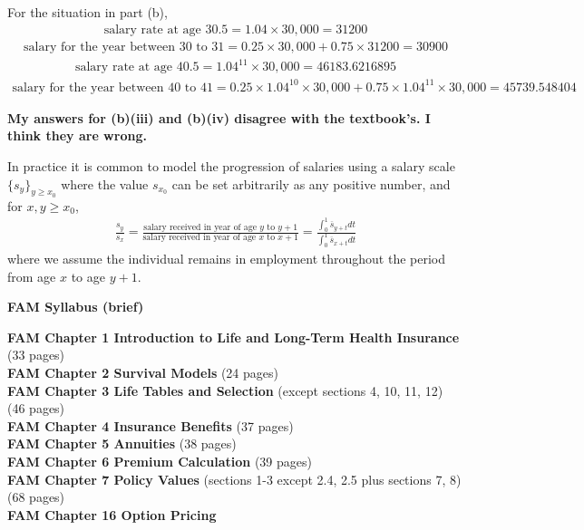 \documentclass[hidelinks, 12pt]{article}
\theoremstyle{mydefstyle}
\theoremstyle{mythmstyle}
\begin{document}
For the situation in part (b),
\begin{gather*}
\mbox{salary rate at age 30.5} = 1.04 \times 30,000 = 31200
\end{gather*}
\begin{gather*}
\mbox{salary for the year between 30 to 31} = 0.25 \times 30,000 + 0.75 \times 31200 = 30900
\end{gather*}
\begin{gather*}
\mbox{salary rate at age 40.5} = 1.04^{11} \times 30,000 = 46183.6216895
\end{gather*}
\begin{gather*}
\mbox{salary for the year between 40 to 41} = 0.25 \times 1.04^{10} \times 30,000 + 0.75 \times 1.04^{11} \times 30,000
= 45739.548404
\end{gather*}

\color{red}
\textbf{My answers for (b)(iii) and (b)(iv) disagree with the textbook's. I think they are wrong.}
\color{black}

In practice it is common to model the progression of salaries using a salary scale $\{s_y\}_{y \ge x_0}$ where the value $s_{x_0}$ can be set arbitrarily as any positive number, and for $x, y \ge x_0$,
\begin{gather*}
\frac{s_y}{s_x} = \frac{\mbox{salary received in year of age $y$ to $y+1$}}{\mbox{salary received in year of age $x$ to $x+1$}}
= \frac{\int_0^1 \overline{s}_{y+t} dt}{\int_0^1 \overline{s}_{x+t} dt}
\end{gather*}
where we assume the individual remains in employment throughout the period from age $x$ to age $y+1$. 

\newpage

\begin{center}
\textbf{FAM Syllabus (brief)}
\end{center}

\textbf{FAM Chapter 1 Introduction to Life and Long-Term Health Insurance} (33 pages) \\
\textbf{FAM Chapter 2 Survival Models} (24 pages) \\
\textbf{FAM Chapter 3 Life Tables and Selection} (except sections 4, 10, 11, 12) (46 pages) \\
\textbf{FAM Chapter 4 Insurance Benefits} (37 pages) \\
\textbf{FAM Chapter 5 Annuities} (38 pages) \\
\textbf{FAM Chapter 6 Premium Calculation} (39 pages) \\
\textbf{FAM Chapter 7 Policy Values} (sections 1-3 except 2.4, 2.5 plus sections 7, 8) (68 pages) \\
\textbf{FAM Chapter 16 Option Pricing}
\end{document}
